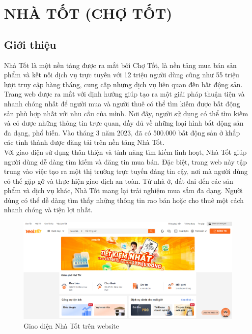 \section{NHÀ TỐT (CHỢ TỐT)}
\subsection{Giới thiệu}
\hspace*{1cm} Nhà Tốt là một nền tảng được ra mắt bởi Chợ Tốt, là nền tảng mua bán sản phẩm và kết nối dịch vụ trực tuyến với 12 triệu người dùng cũng như 55 triệu lượt truy cập hàng tháng, cung cấp những dịch vụ liên quan đến bất động sản. Trang web được ra mắt với định hướng giúp tạo ra một giải pháp thuận tiện và nhanh chóng nhất để người mua và người thuê có thể tìm kiếm được bất động sản phù hợp nhất với nhu cầu của mình. Nơi đây, người sử dụng có thể tìm kiếm và có được những thông tin trực quan, đầy đủ về những loại hình bất động sản đa dạng, phổ biến. Vào tháng 3 năm 2023, đã có 500.000 bất động sản ở khắp các tỉnh thành được đăng tải trên nền tảng Nhà Tốt. \cite{nhatot}\\
\hspace*{1cm} Với giao diện sử dụng thân thiện và tính năng tìm kiếm linh hoạt, Nhà Tốt giúp người dùng dễ dàng tìm kiếm và đăng tin mua bán. Đặc biệt, trang web này tập trung vào việc tạo ra một thị trường trực tuyến đáng tin cậy, nơi mà người dùng có thể gặp gỡ và thực hiện giao dịch an toàn. Từ nhà ở, đất đai đến các sản phẩm và dịch vụ khác, Nhà Tốt mang lại trải nghiệm mua sắm đa dạng. Người dùng có thể dễ dàng tìm thấy những thông tin rao bán hoặc cho thuê một cách nhanh chóng và tiện lợi nhất.\\
\begin{figure}[H]
    \centering
    \includegraphics[width=1\textwidth]{Images/RelatedSystems/NhatotDesktop.png}
    \caption{Giao diện Nhà Tốt trên website}
\end{figure}
